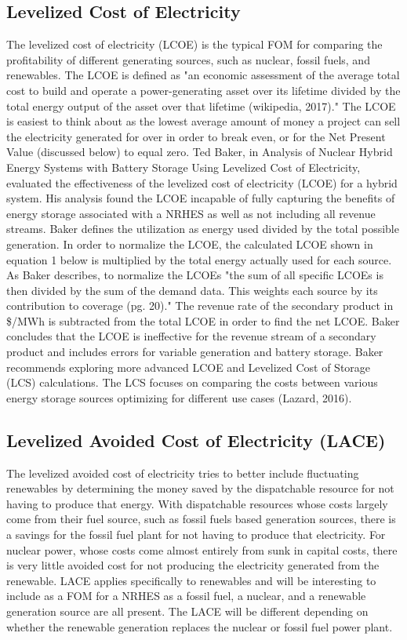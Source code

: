 \documentclass[12pt]{UIdahoMastersThesis}
\begin{document}
\subsection{Levelized Cost of Electricity}
The levelized cost of electricity (LCOE) is the typical FOM for comparing the profitability of different generating sources, such as nuclear, fossil fuels, and renewables. The LCOE is defined as "an economic assessment of the average total cost to build and operate a power-generating asset over its lifetime divided by the total energy output of the asset over that lifetime (wikipedia, 2017)." The LCOE is easiest to think about as the lowest average amount of money a project can sell the electricity generated for over in order to break even, or for the Net Present Value (discussed below) to equal zero. Ted Baker, in Analysis of  Nuclear Hybrid Energy Systems with Battery Storage Using Levelized Cost of Electricity, evaluated the effectiveness of the levelized cost of electricity (LCOE) for a hybrid system. His analysis found the LCOE incapable of fully capturing the benefits of energy storage associated with a NRHES as well as not including all revenue streams.  Baker defines the utilization as energy used divided by the total possible generation. In order to normalize the LCOE, the calculated LCOE shown in equation 1 below is multiplied by the total energy actually used for each source.  As Baker describes, to normalize the LCOEs "the sum of all specific LCOEs is then divided by the sum of the demand data. This weights each source by its contribution to coverage (pg. 20)."  The revenue rate of the secondary product in \$/MWh is subtracted from the total LCOE in order to find the net LCOE.  Baker concludes that the LCOE is ineffective for the revenue stream of a secondary product and includes errors for variable generation and battery storage. Baker recommends exploring more advanced LCOE and Levelized Cost of Storage (LCS) calculations. The LCS focuses on comparing the costs between various energy storage sources optimizing for different use cases (Lazard, 2016).

\subsection{Levelized Avoided Cost of Electricity (LACE)}
The levelized avoided cost of electricity tries to better include fluctuating renewables by determining the money saved by the dispatchable resource for not having to produce that energy. With dispatchable resources whose costs largely come from their fuel source, such as fossil fuels based generation sources, there is a savings for the fossil fuel plant for not having to produce that electricity.  For nuclear power, whose costs come almost entirely from sunk in capital costs, there is very little avoided cost for not producing the electricity generated from the renewable.  LACE applies specifically to renewables and will be interesting to include as a FOM for a NRHES as a fossil fuel, a nuclear, and a renewable generation source are all present. The LACE will be different depending on whether the renewable generation replaces the nuclear or fossil fuel power plant.
\end{document}
